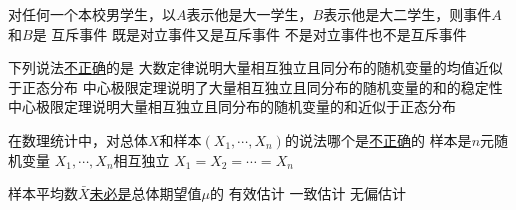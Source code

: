 \begin{question}
对任何一个本校男学生，以$A$表示他是大一学生，$B$表示他是大二学生，则事件$A$和$B$是
	{互斥事件}
	{既是对立事件又是互斥事件}
	{不是对立事件也不是互斥事件}
\end{question}



\begin{question}
下列说法\uline{不正确}的是
	{大数定律说明大量相互独立且同分布的随机变量的均值近似于正态分布}
	{中心极限定理说明了大量相互独立且同分布的随机变量的和的稳定性}
	{中心极限定理说明大量相互独立且同分布的随机变量的和近似于正态分布}
\end{question}



\begin{question}
在数理统计中，对总体$X$和样本$(X_1,\cdots,X_n)$的说法哪个是\uline{不正确}的
	{样本是$n$元随机变量}
	{$X_1, \cdots, X_n$相互独立}
	{$X_1 = X_2 =\cdots = X_n$}
\end{question}



\begin{question}
样本平均数$\bar{X}$\uline{未必是}总体期望值$\mu$的
	{有效估计}
	{一致估计}
	{无偏估计}
\end{question} 